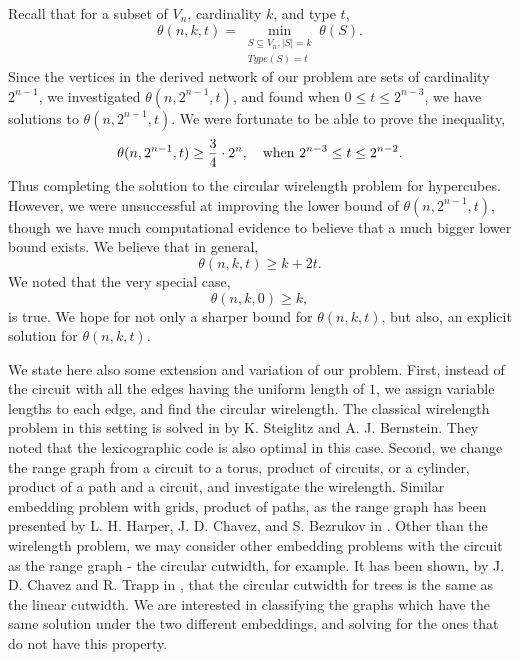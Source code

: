 \documentclass[12pt]{ucthesis}
\theoremstyle{plain}
\theoremstyle{definition}
\begin{document}
Recall that for a subset of $V_n$, cardinality $k$, and type $t$,
\begin{equation*}
\theta(n, k, t) = \min_{\substack{
	S \subseteq V_n, |S| = k \\
	Type(S) = t
}} \theta(S).
\end{equation*}
Since the vertices in the derived network of our problem are sets of cardinality $2^{n - 1}$,
we investigated $\theta(n, 2^{n - 1}, t)$,
and found when $0 \le t \le 2^{n - 3}$, we have solutions to $\theta(n, 2^{n - 1}, t)$.
We were fortunate to be able to prove the inequality,
\begin{equation*}
\theta(n, 2^{n - 1}, t) \ge \frac{3}{4} \cdot 2^n, \quad
\textnormal{when } 2^{n - 3} \le t \le 2^{n - 2}.
\end{equation*}
Thus completing the solution to the circular wirelength problem for hypercubes.
However, we were unsuccessful at improving the lower bound of $\theta(n, 2^{n - 1}, t)$,
though we have much computational evidence to believe that a much bigger lower bound exists.
We believe that in general,
\begin{equation*}
\theta(n, k, t) \ge k + 2 t.
\end{equation*}
We noted that the very special case,
\begin{equation*}
\theta(n, k, 0) \ge k,
\end{equation*}
is true.
We hope for not only a sharper bound for $\theta(n, k, t)$,
but also, an explicit solution for $\theta(n, k, t)$.

We state here also some extension and variation of our problem.
First, instead of the circuit with all the edges having the uniform length of $1$,
we assign variable lengths to each edge, and find the circular wirelength.
The classical wirelength problem in this setting is solved in \cite{Steiglitz.1965}
by K. Steiglitz and A. J. Bernstein.
They noted that the lexicographic code is also optimal in this case.
Second, we change the range graph from a circuit to a torus, product of circuits,
or a cylinder, product of a path and a circuit, and investigate the wirelength.
Similar embedding problem with grids, product of paths, as the range graph
has been presented by L. H. Harper, J. D. Chavez, and S. Bezrukov in \cite{Bezrukov.2000}.
Other than the wirelength problem, we may consider other embedding problems
with the circuit as the range graph - the circular cutwidth, for example.
It has been shown, by J. D. Chavez and R. Trapp in \cite{Chavez.1998},
that the circular cutwidth for trees is the same as the linear cutwidth.
We are interested in classifying the graphs which have the same solution
under the two different embeddings, and solving for the ones that do not have this property.
\end{document}
